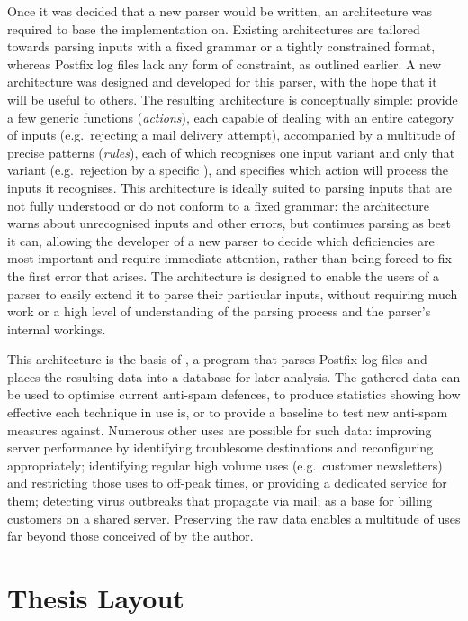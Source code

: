 Once it was decided that a new parser would be written, an architecture was
required to base the implementation on.  Existing architectures are
tailored towards parsing inputs with a fixed grammar or a tightly
constrained format, whereas Postfix log files lack any form of constraint,
as outlined earlier.  A new architecture was designed and developed for
this parser, with the hope that it will be useful to others.  The resulting
architecture is conceptually simple: provide a few generic functions
(\textit{actions\/}), each capable of dealing with an entire category of
inputs (e.g.\ rejecting a mail delivery attempt), accompanied by a
multitude of precise patterns (\textit{rules\/}), each of which recognises
one input variant and only that variant (e.g.\ rejection by a specific
), and specifies which action will process the inputs it
recognises.  This architecture is ideally suited to parsing inputs that are
not fully understood or do not conform to a fixed grammar: the architecture
warns about unrecognised inputs and other errors, but continues parsing as
best it can, allowing the developer of a new parser to decide which
deficiencies are most important and require immediate attention, rather
than being forced to fix the first error that arises.
The architecture is designed to enable the users of a parser to
easily extend it to parse their particular inputs, without requiring much
work or a high level of understanding of the parsing process and the
parser's internal workings.

This architecture is the basis of \parsername{}, a program that parses
Postfix log files and places the resulting data into a database for later
analysis.  The gathered data can be used to optimise current anti-spam
defences, to produce statistics showing how effective each technique in use
is, or to provide a baseline to test new anti-spam measures against.
Numerous other uses are possible for such data: improving server
performance by identifying troublesome destinations and reconfiguring
appropriately; identifying regular high volume uses (e.g.\ customer
newsletters) and restricting those uses to off-peak times, or providing a
dedicated service for them; detecting virus outbreaks that propagate via
mail; as a base for billing customers on a shared server.  Preserving the
raw data enables a multitude of uses far beyond those conceived of by the
author.

\section{Thesis Layout}

